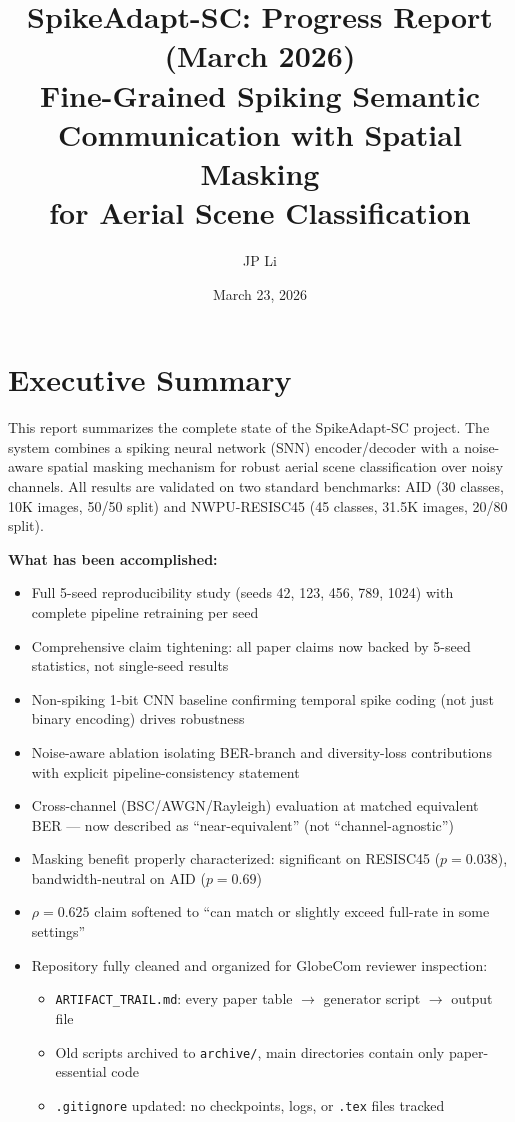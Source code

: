 \documentclass[11pt]{article}
\title{\textbf{SpikeAdapt-SC: Progress Report (March 2026)}\\
\large Fine-Grained Spiking Semantic Communication with Spatial Masking\\for Aerial Scene Classification}
\author{JP Li}
\date{March 23, 2026}
\begin{document}
\maketitle

\section{Executive Summary}

This report summarizes the complete state of the SpikeAdapt-SC project. The system combines a spiking neural network (SNN) encoder/decoder with a noise-aware spatial masking mechanism for robust aerial scene classification over noisy channels. All results are validated on two standard benchmarks: AID (30 classes, 10K images, 50/50 split) and NWPU-RESISC45 (45 classes, 31.5K images, 20/80 split).

\textbf{What has been accomplished:}
\begin{itemize}[nosep]
    \item Full 5-seed reproducibility study (seeds 42, 123, 456, 789, 1024) with complete pipeline retraining per seed
    \item Comprehensive claim tightening: all paper claims now backed by 5-seed statistics, not single-seed results
    \item Non-spiking 1-bit CNN baseline confirming temporal spike coding (not just binary encoding) drives robustness
    \item Noise-aware ablation isolating BER-branch and diversity-loss contributions with explicit pipeline-consistency statement
    \item Cross-channel (BSC/AWGN/Rayleigh) evaluation at matched equivalent BER --- now described as ``near-equivalent'' (not ``channel-agnostic'')
    \item Masking benefit properly characterized: significant on RESISC45 ($p{=}0.038$), bandwidth-neutral on AID ($p{=}0.69$)
    \item $\rho{=}0.625$ claim softened to ``can match or slightly exceed full-rate in some settings''
    \item Repository fully cleaned and organized for GlobeCom reviewer inspection:
    \begin{itemize}[nosep]
        \item \texttt{ARTIFACT\_TRAIL.md}: every paper table $\to$ generator script $\to$ output file
        \item Old scripts archived to \texttt{archive/}, main directories contain only paper-essential code
        \item \texttt{.gitignore} updated: no checkpoints, logs, or \texttt{.tex} files tracked
    \end{itemize}
\end{itemize}
\end{document}
